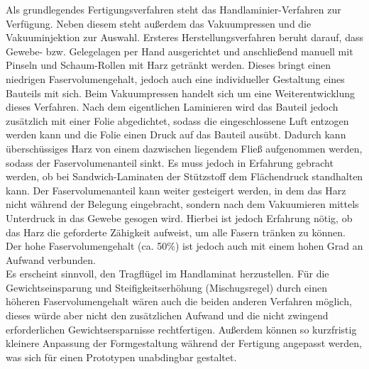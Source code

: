 \noindent Als grundlegendes Fertigungsverfahren steht das Handlaminier-Verfahren zur Verfügung. Neben diesem steht außerdem das Vakuumpressen und die Vakuuminjektion zur Auswahl. Ersteres Herstellungsverfahren beruht darauf, dass Gewebe- bzw. Gelegelagen per Hand ausgerichtet und anschließend manuell mit Pinseln und Schaum-Rollen mit Harz getränkt werden. Dieses bringt einen niedrigen Faservolumengehalt, jedoch auch eine individueller Gestaltung eines Bauteils mit sich. Beim Vakuumpressen handelt sich um eine Weiterentwicklung dieses Verfahren. Nach dem eigentlichen Laminieren wird das Bauteil jedoch zusätzlich mit einer Folie abgedichtet, sodass die eingeschlossene Luft entzogen werden kann und die Folie einen Druck auf das Bauteil ausübt. Dadurch kann überschüssiges Harz von einem dazwischen liegendem Fließ aufgenommen werden, sodass der Faservolumenanteil sinkt. Es muss jedoch in Erfahrung gebracht werden, ob bei Sandwich-Laminaten der Stützstoff dem Flächendruck standhalten kann. Der Faservolumenanteil kann weiter gesteigert werden, in dem das Harz nicht während der Belegung eingebracht, sondern nach dem Vakuumieren mittels Unterdruck in das Gewebe gesogen wird. Hierbei ist jedoch Erfahrung nötig, ob das Harz die geforderte Zähigkeit aufweist, um alle Fasern tränken zu können. Der hohe Faservolumengehalt (ca. 50\%) ist jedoch auch mit einem hohen Grad an Aufwand verbunden.\\

\noindent Es erscheint sinnvoll, den Tragflügel im Handlaminat herzustellen. Für die Gewichtseinsparung und Steifigkeitserhöhung (Mischugsregel) durch einen höheren Faservolumengehalt wären auch die beiden anderen Verfahren möglich, dieses würde aber nicht den zusätzlichen Aufwand und die nicht zwingend erforderlichen Gewichtsersparnisse rechtfertigen. Außerdem können so kurzfristig kleinere Anpassung der Formgestaltung während der Fertigung angepasst werden, was sich für einen Prototypen unabdingbar gestaltet.
